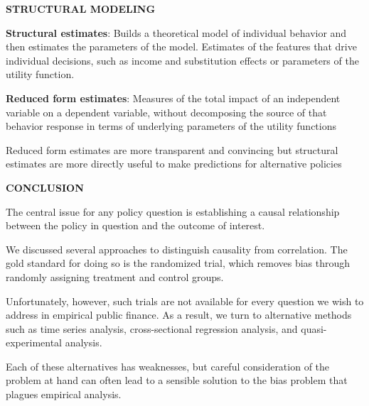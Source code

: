 \documentclass[landscape]{slides}
\begin{document}
\begin{slide}

\end{slide}

\begin{slide}
\begin{center}
{\bf STRUCTURAL MODELING}
\end{center}

{\bf Structural estimates}: Builds a theoretical model of individual behavior and then estimates the
parameters of the model.
Estimates of the features that drive individual decisions, such as income and substitution effects or
parameters of the utility function.

{\bf Reduced form estimates}:
Measures of the total impact of an independent variable on a dependent variable, without decomposing the source of that behavior response in terms of underlying parameters of the utility functions

Reduced form estimates are more transparent and convincing but structural estimates are more directly useful
to make predictions for alternative policies

\end{slide}

\begin{slide}
\begin{center}
{\bf CONCLUSION}
\end{center}

The central issue for any policy question is establishing a causal relationship between the policy in question and the outcome of interest.

We discussed several approaches to distinguish causality from correlation. The gold standard for doing so is the randomized trial, which removes bias through randomly assigning treatment and control groups.

Unfortunately, however, such trials are not available for every question we  wish to address in empirical public finance. As a result, we turn to alternative methods such as time series analysis, cross-sectional regression analysis, and quasi-experimental analysis.

Each of these alternatives has weaknesses, but careful consideration of the problem at hand can often lead to a sensible solution to the bias problem that plagues empirical analysis.

\end{slide}
\end{document}
